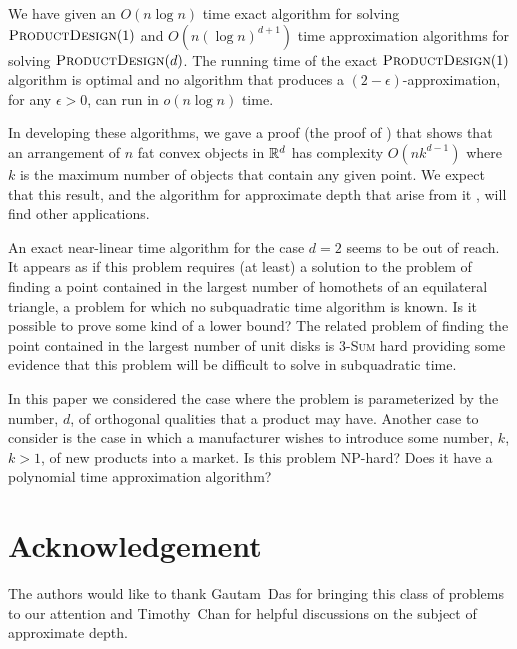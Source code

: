 \documentclass[lotsofwhite]{patmorin}
\newcommand{\eps}{\epsilon}
\begin{document}
We have given an $O(n\log n)$ time exact algorithm for solving
$\textsc{ProductDesign}(1)$ and $O(n(\log n)^{d+1})$ time approximation
algorithms for solving $\textsc{ProductDesign}(d)$.  The running time of
the exact $\textsc{ProductDesign}(1)$ algorithm is optimal and no algorithm
that produces a $(2-\eps)$-approximation, for any $\epsilon > 0$, can run
in $o(n\log n)$ time.  

In developing these algorithms, we gave a proof (the
proof of ) that shows that an arrangement of $n$ fat convex
objects in $\mathbb{R}^d$ has complexity $O(nk^{d-1})$ where $k$ is the maximum
number of objects that contain any given point. We expect that this result,
and the algorithm for approximate depth that arise from it \cite{ah08},
will find other applications.

An exact near-linear time algorithm for the case $d=2$ seems to be out of
reach.  It appears as if this problem requires (at least) a solution to the
problem of finding a point contained in the largest number of homothets of
an equilateral triangle, a problem for which no subquadratic time algorithm
is known.  Is it possible to prove some kind of a lower bound?  The related
problem of finding the point contained in the largest number of unit disks
is \textsc{3-Sum} hard \cite{ah08} providing some evidence that this
problem will be difficult to solve in subquadratic time.

In this paper we considered the case where the problem is parameterized by
the number, $d$, of orthogonal qualities that a product may have.  Another
case to consider is the case in which a manufacturer wishes to introduce
some number, $k$, $k>1$, of new products into a market.   Is this problem
NP-hard?  Does it have a polynomial time approximation algorithm?


\section*{Acknowledgement}

The authors would like to thank Gautam~Das for bringing this class of
problems to our attention and Timothy~Chan for helpful discussions on
the subject of approximate depth.



\end{document}
